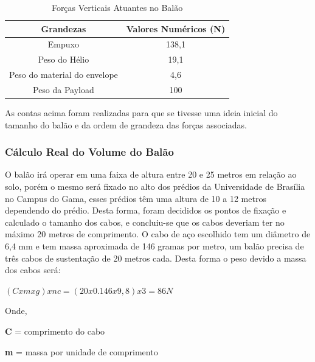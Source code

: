 	 \begin{table}[H]
		\centering
		\begin{tabular}{|c|c|}
			\hline
			\rowcolor[HTML]{FFFFFF}
			{\color[HTML]{000000} \textbf{Grandezas}} & {\color[HTML]{000000} \textbf{Valores Numéricos (N)}} \\ \hline
			Empuxo                                    & 138,1                                                 \\ \hline
			Peso do Hélio                             & 19,1                                                  \\ \hline
			Peso do material do envelope              & 4,6                                                   \\ \hline
			Peso da Payload                           & 100                                                   \\ \hline
		\end{tabular}
		\caption{Forças Verticais Atuantes no Balão}
		\label{tab:forcasVerticaisAtuantes}
	\end{table}


As contas acima foram realizadas para que se tivesse uma ideia inicial do tamanho do balão e da ordem de grandeza das forças associadas.


\subsubsection{Cálculo Real do Volume do Balão}

 O  balão irá operar em uma faixa de altura entre 20 e 25 metros em relação ao solo, porém  o mesmo será fixado no alto dos prédios da Universidade de Brasília no Campus do Gama, esses prédios têm uma altura de 10 a 12 metros dependendo do prédio. Desta forma, foram decididos os pontos de fixação e calculado o tamanho dos cabos, e concluiu-se que os cabos deveriam ter no máximo 20 metros de comprimento.
O cabo de aço escolhido tem um diâmetro de 6,4 mm e tem massa aproximada de 146 gramas por metro, um balão precisa de três cabos de sustentação de 20 metros cada. Desta forma o peso devido a massa dos cabos será:

$(C x m x g) x nc = (20 x 0.146 x 9,8 ) x 3 = 86 N$

Onde,

\textbf{C} = comprimento do cabo

\textbf{m} = massa por unidade de comprimento

